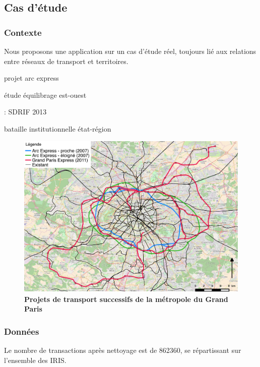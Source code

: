 \documentclass[french]{./sageo}
\begin{document}
\subsection{Cas d'étude}


\subsubsection{Contexte}

Nous proposons une application sur un cas d'étude réel, toujours lié aux relations entre réseaux de transport et territoires.

\cite{damm1980response}

\cite{stif2007arc} projet arc express

\cite{beaucire2013grand} étude équilibrage est-ouest

\cite{sdrif2013} : SDRIF 2013

\cite{desjardins2010bataille} bataille institutionnelle état-région



\begin{figure}[h]
\centering
\includegraphics[width=12cm]{figures/reseaux}
\caption{\textbf{Projets de transport successifs de la métropole du Grand Paris}}
\label{fig:clustering}
\end{figure}

\subsubsection{Données}

Le nombre de transactions après nettoyage est de 862360, se répartissant sur l'ensemble des IRIS.
\end{document}
